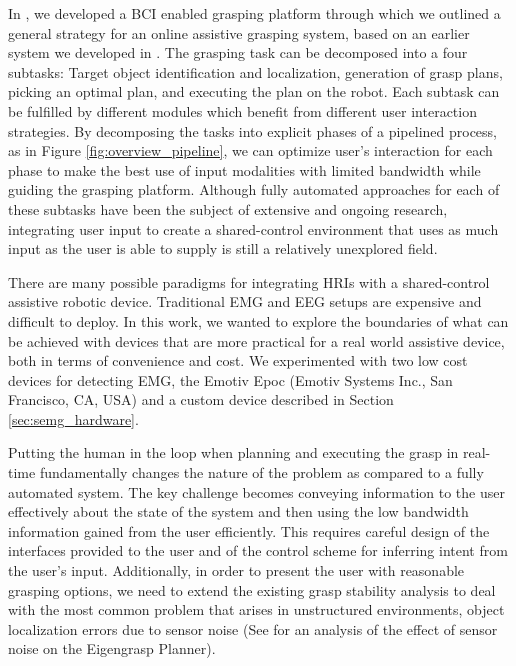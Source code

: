 \renewcommand*{\theHsection}{chX.\the\value{section}}
In \cite{Weisz2013}, we developed a BCI enabled grasping platform through which we outlined a general strategy for an online assistive grasping system, based on an earlier system we developed in \cite{Weisz2012c}.
The grasping task can be decomposed into a four subtasks: Target object identification and localization, generation of grasp plans, picking an optimal plan, and executing the plan on the robot. Each subtask can be fulfilled by different modules which benefit from different user interaction strategies. By decomposing the tasks into explicit phases of a pipelined process, as in Figure \ref{fig:overview_pipeline}, we can optimize user's interaction for each phase to make the best use of input modalities with limited bandwidth while guiding the grasping platform. 
Although fully automated approaches for each of these subtasks have been the subject of extensive and ongoing research, integrating user input to create a shared-control environment that uses as much input as the user is able to supply is still a relatively unexplored field.

 There are many possible paradigms for integrating HRIs with a shared-control assistive robotic device. Traditional EMG and EEG setups are expensive and difficult to deploy. In this work, we wanted to explore the boundaries of what can be achieved with devices that are more practical for a real world assistive device, both in terms of convenience and cost. We experimented with two low cost devices for detecting EMG, the Emotiv Epoc (Emotiv Systems Inc., San Francisco, CA, USA) and a custom device described in Section \ref{sec:semg_hardware}. 

Putting the human in the loop when planning and executing the grasp in real-time fundamentally changes the nature of the problem as compared to a fully automated system. The key challenge becomes conveying information to the user effectively about the state of the system and then using the low bandwidth information gained from the user efficiently. This requires careful design of the interfaces provided to the user and of the control scheme for inferring intent from the user's input. Additionally, in order to present the user with reasonable grasping options, we need to extend the existing grasp stability analysis to deal with the most common problem that arises in unstructured environments, object localization errors due to sensor noise (See \cite{Weisz2012} for an analysis of the effect of sensor noise on the Eigengrasp Planner). 


